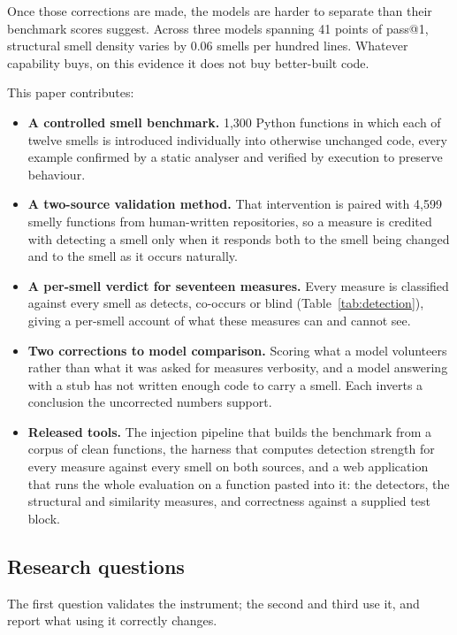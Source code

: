 \documentclass[10pt,a4paper,twocolumn]{article}
\begin{document}
Once those corrections are made, the models are harder to separate than their
benchmark scores suggest. Across three models spanning 41 points of pass@1,
structural smell density varies by 0.06 smells per hundred lines.
Whatever capability buys, on this evidence it does not buy better-built code.

This paper contributes:

\begin{itemize}
  \item \textbf{A controlled smell benchmark.} 1{,}300 Python functions in which
        each of twelve smells is introduced individually into otherwise unchanged
        code, every example confirmed by a static analyser and verified by
        execution to preserve behaviour.
  \item \textbf{A two-source validation method.} That intervention is paired with
        4{,}599 smelly functions from human-written repositories, so a measure is
        credited with detecting a smell only when it responds both to the smell
        being changed and to the smell as it occurs naturally.
  \item \textbf{A per-smell verdict for seventeen measures.} Every measure is
        classified against every smell as detects, co-occurs or
        blind (Table~\ref{tab:detection}), giving a per-smell account of
        what these measures can and cannot see.
  \item \textbf{Two corrections to model comparison.} Scoring what a model
        volunteers rather than what it was asked for measures verbosity, and a
        model answering with a stub has not written enough code to carry a smell.
        Each inverts a conclusion the uncorrected numbers support.
  \item \textbf{Released tools.} The injection pipeline that builds the
        benchmark from a corpus of clean functions, the harness that computes
        detection strength for every measure against every smell on both sources,
        and a web application that runs the whole evaluation on a function pasted
        into it: the detectors, the structural and similarity measures, and
        correctness against a supplied test block.
\end{itemize}

\subsection{Research questions}

The first question validates the instrument; the second and third use it, and
report what using it correctly changes.
\end{document}
